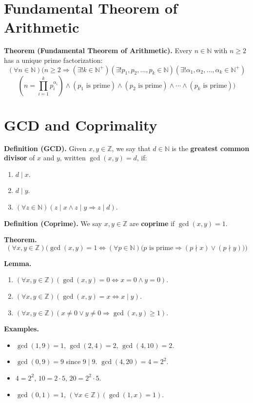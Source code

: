 \documentclass[12pt]{article}
\newcommand{\defn}[1]{\textbf{#1}}
\theoremstyle{proofstyle}
\begin{document}
\section*{Fundamental Theorem of Arithmetic}

\textbf{Theorem (Fundamental Theorem of Arithmetic).} Every $n \in \mathbb{N}$
with $n \geq 2$ has a unique prime factorization:
\[
    (\forall n \in \mathbb{N})\Big(n \geq 2 \Rightarrow
    (\exists! k \in \mathbb{N}^+)(\exists! p_1, p_2, \ldots, p_k \in \mathbb{N})
    (\exists! \alpha_1, \alpha_2, \ldots, \alpha_k \in \mathbb{N}^+)
\]
\[
    \left(n = \prod_{i=1}^{k} p_i^{\alpha_i}\right)
    \wedge (p_1 \text{ is prime}) \wedge (p_2 \text{ is prime})
    \wedge \cdots \wedge (p_k \text{ is prime})\Big)
\]

\section*{GCD and Coprimality}

\textbf{Definition (GCD).} Given $x, y \in \mathbb{Z}$, we say that $d \in \mathbb{N}$
is the \defn{greatest common divisor} of $x$ and $y$, written $\gcd(x, y) = d$, if:
\begin{enumerate}[label=\arabic*., itemsep=0.5em]
    \item $d \mid x$.
    \item $d \mid y$.
    \item $(\forall z \in \mathbb{N})(z \mid x \wedge z \mid y \Rightarrow z \mid d)$.
\end{enumerate}

\textbf{Definition (Coprime).} We say $x, y \in \mathbb{Z}$ are \defn{coprime} if
$\gcd(x, y) = 1$.

\textbf{Theorem.}
\[
    (\forall x, y \in \mathbb{Z})\Big(\gcd(x,y) = 1 \iff
    (\forall p \in \mathbb{N})\big(p \text{ is prime} \Rightarrow
    (p \nmid x) \vee (p \nmid y)\big)\Big)
\]

\textbf{Lemma.}
\begin{enumerate}[label=\arabic*., itemsep=0.5em]
    \item $(\forall x, y \in \mathbb{Z})(\gcd(x,y) = 0 \iff x = 0 \wedge y = 0)$.
    \item $(\forall x, y \in \mathbb{Z})(\gcd(x,y) = x \iff x \mid y)$.
    \item $(\forall x, y \in \mathbb{Z})(x \neq 0 \vee y \neq 0 \Rightarrow \gcd(x,y) \geq 1)$.
\end{enumerate}

\textbf{Examples.}
\begin{itemize}[itemsep=0.5em]
    \item $\gcd(1, 9) = 1$, \quad $\gcd(2, 4) = 2$, \quad $\gcd(4, 10) = 2$.
    \item $\gcd(0, 9) = 9$ since $9 \mid 9$. \quad $\gcd(4, 20) = 4 = 2^2$.
    \item $4 = 2^2$, \quad $10 = 2 \cdot 5$, \quad $20 = 2^2 \cdot 5$.
    \item $\gcd(0, 1) = 1$, \quad $(\forall x \in \mathbb{Z})(\gcd(1, x) = 1)$.
\end{itemize}
\end{document}
